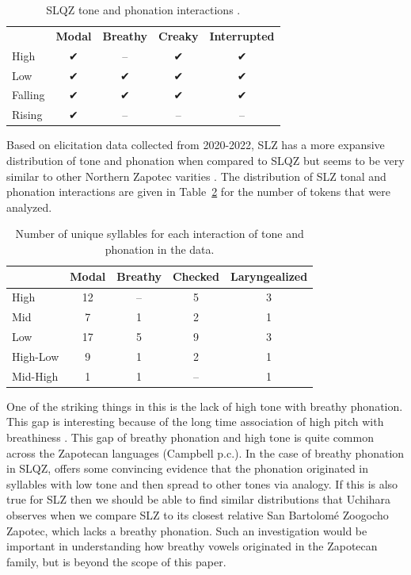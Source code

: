 \documentclass[12pt, letterpaper]{article}
\providecommand{\lsptoprule}{\midrule\toprule}
\providecommand{\lspbottomrule}{\bottomrule\midrule}
\begin{document}
\begin{table}[!ht]
	\centering
	\caption{SLQZ tone and phonation interactions \citep{chavez-peonInteractionMetricalStructure2010}.}
	\label{tab:SLQZ}
	 \begin{tabular}{lcccc}
	  \lsptoprule
					  &	 \textbf{Modal}  & \textbf{Breathy} & \textbf{Creaky} & \textbf{Interrupted} \\
		  High	& ✔︎ & -- & ✔︎ & ✔︎ \\
		  Low & ✔︎ & ✔︎ & ✔︎ & ✔︎ \\
		  Falling & ✔︎ & ✔︎ & ✔︎ & ✔︎ \\
		  Rising & ✔︎ & -- & -- & -- \\
	  \lspbottomrule
	 \end{tabular}
\end{table}

Based on elicitation data collected from 2020-2022, SLZ has a more expansive distribution of tone and phonation when compared to SLQZ but seems to be very similar to other Northern Zapotec varities \citep[e.g.,][]{avelinobecerraTopicsYalalagZapotec2004}. The distribution of SLZ tonal and phonation interactions are given in Table~\ref{tab:ToneVoiceQuality} for the number of tokens that were analyzed. 
\begin{table}[!h]
	\caption{Number of unique syllables for each interaction of tone and phonation in the data.}
	\label{tab:ToneVoiceQuality}
	\centering

	\begin{tabular}{lcccc}
	\lsptoprule
		& \textbf{Modal} & \textbf{Breathy} & \textbf{Checked} & \textbf{Laryngealized} \\
	\hline
	High		& 12 & -- & 5	& 3 \\
	Mid			& 7 & 1  & 2	& 1 \\
	Low			& 17 & 5  & 9	& 3 \\
	High-Low	& 9 & 1  & 2	& 1 \\
	Mid-High	& 1	 & 1  & --	& 1 \\
	\lspbottomrule
	\end{tabular}
\end{table}

One of the striking things in this is the lack of high tone with breathy phonation. This gap is interesting because of the long time association of high pitch with breathiness \citep[a good overview–of this association and other phoantion types–is found in][]{eslingVoiceQualityLaryngeal2019}. This gap of breathy phonation and high tone is quite common across the Zapotecan languages (Campbell p.c.). In the case of breathy phonation in SLQZ, \citet{uchiharaToneRegistrogenesisQuiavini2016} offers some convincing evidence that the phonation originated in syllables with low tone and then spread to other tones via analogy. If this is also true for SLZ then we should be able to find similar distributions that Uchihara observes when we compare SLZ to its closest relative San Bartolomé Zoogocho Zapotec, which lacks a breathy phonation. Such an investigation would be important in understanding how breathy vowels originated in the Zapotecan family, but is beyond the scope of this paper.  
\end{document}
